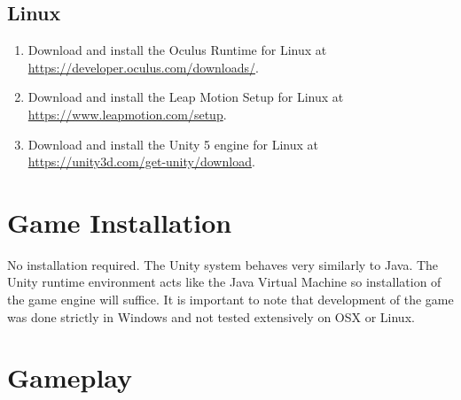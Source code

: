 \documentclass[a4paper]{refart}
\begin{document}
\subsection{Linux}

\begin{enumerate}
	\item Download and install the Oculus Runtime for Linux at\\ \url{https://developer.oculus.com/downloads/}.
	\item Download and install the Leap Motion Setup for Linux at\\ \url{https://www.leapmotion.com/setup}.
	\item Download and install the Unity 5 engine for Linux at\\ \url{https://unity3d.com/get-unity/download}.
\end{enumerate}

\pagebreak

\section{Game Installation}

No installation required. The Unity system behaves very similarly to Java. The Unity runtime environment acts like the Java Virtual Machine so installation of the game engine will suffice. It is important to note that development of the game was done strictly in Windows and not tested extensively on OSX or Linux. 

\section{Gameplay}
\end{document}
